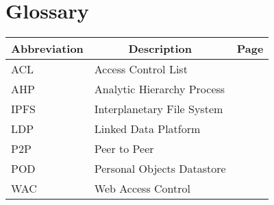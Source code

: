 

\chapter[Glossary]{Glossary}

\begin{center}
\small
\begin{longtable}{lp{3.0in}c}
\toprule \multicolumn{1}{c}{Abbreviation}
                & \multicolumn{1}{c}{Description}
                                & \multicolumn{1}{c}{Page}\\ \midrule\addlinespace[2pt] \endhead

\bottomrule\endfoot

ACL & Access Control List & \pageref{sym:ACL} \\
AHP & Analytic Hierarchy Process & \pageref{sym:AHP} \\
IPFS & Interplanetary File System & \pageref{sym:IPFS} \\
LDP & Linked Data Platform & \pageref{sym:LDP} \\
P2P & Peer to Peer & \pageref{sym:P2P} \\
POD & Personal Objects Datastore & \pageref{sym:POD} \\
WAC & Web Access Control & \pageref{sym:WAC}

\end{longtable}

\end{center}

